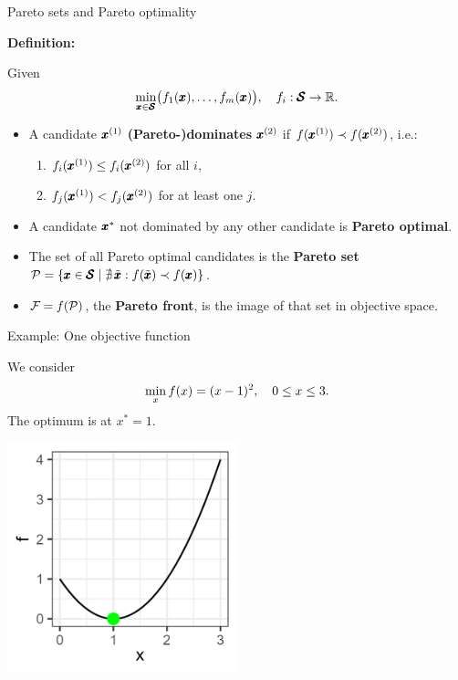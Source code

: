 \documentclass[11pt,compress,t,notes=noshow,xcolor=table]{beamer}
\begin{document}
\begin{vbframe}{Pareto sets and Pareto optimality}

\textbf{Definition:}

Given 
\[
\min_{\pmb{x} \in \pmb{\mathcal{S}}} 
   \bigl(f_1(\pmb{x}), \dots, f_m(\pmb{x})\bigr), 
\quad f_i: \pmb{\mathcal{S}} \to \mathbb{R}.
\]

\begin{itemize}
  \item A candidate \(\pmb{x}^{(1)}\) \textbf{(Pareto-)dominates} \(\pmb{x}^{(2)}\) 
        if \(f(\pmb{x}^{(1)}) \prec f(\pmb{x}^{(2)})\), i.e.:
    \begin{enumerate}
      \item \(f_i(\pmb{x}^{(1)}) \le f_i(\pmb{x}^{(2)})\) for all \(i\),
      \item \(f_j(\pmb{x}^{(1)}) < f_j(\pmb{x}^{(2)})\) for at least one \(j\).
    \end{enumerate}
    \item A candidate \({\pmb{x}}^*\) not dominated by any other candidate is 
          \textbf{Pareto optimal}.
    \item The set of all Pareto optimal candidates is the \textbf{Pareto set} 
          \(\mathcal{P} = \{\pmb{x} \in \pmb{\mathcal{S}} \mid \nexists \,\tilde{\pmb{x}} :
               f(\tilde{\pmb{x}}) \prec f(\pmb{x})\}\).
    \item \(\mathcal{F} = f(\mathcal{P})\), the \textbf{Pareto front}, 
          is the image of that set in objective space.
\end{itemize}

\end{vbframe}


\begin{vbframe}{Example: One objective function}

We consider 
\[
\min_{x} f(x) = (x - 1)^2, 
\quad 0 \le x \le 3.
\]
The optimum is at \(x^* = 1\).

\begin{center}
\includegraphics[width=0.5\textwidth]{slides/11-multicrit/figure_man/graph1.png}
\end{center}

\end{vbframe}
\end{document}
